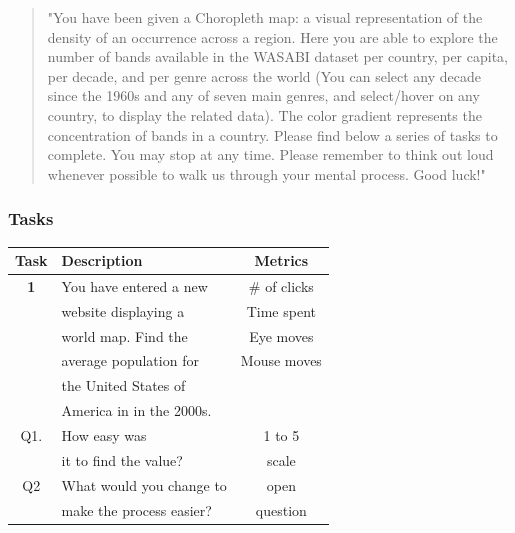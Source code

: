 \documentclass[twocolumn, letterpaper,13pt]{scrartcl}
\begin{document}
    \begin{quote}
        "You have been given a Choropleth map: a visual representation of the density of an occurrence across a region. 
        \newline\newline
        Here you are able to explore the number of bands available in the WASABI dataset per country, per capita, per decade, and per genre across the world (You can select any decade since the 1960s and any of seven main genres, and select/hover on any country, to display the related data). 
        \newline\newline
        The color gradient represents the concentration of bands in a country.
        \newline\newline
        Please find below a series of tasks to complete. You may stop at any time. Please remember to think out loud whenever possible to walk us through your mental process. Good luck!"
    \end{quote}
    
    \subsubsection*{Tasks}
    
    \begin{center}
    \begin{tabular} { | c | l | c | }
    \hline
     Task & Description & Metrics \\
    \hline
    \textbf{1} & You have entered a new & \# of clicks \\
    & website displaying a & Time spent\\
    & world map. Find the & Eye moves\\
    & average population for & Mouse moves\\
    & the United States of & \\
    & America in in the 2000s.& \\
    \hline
    Q1. & How easy was & 1 to 5\\
    & it to find the value? & scale \\
    \hline
    Q2 & What would you change to & open\\
    & make the process easier? & question\\
    \hline
    \end{tabular}
    \end{center}
\end{document}
